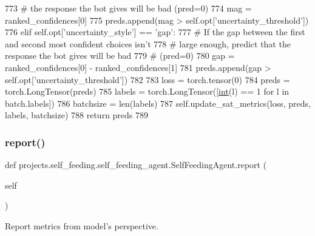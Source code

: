 \begin{DoxyCode}
773                 \textcolor{comment}{# the response the bot gives will be bad (pred=0)}
774                 mag = ranked\_confidences[0]
775                 preds.append(mag > self.opt[\textcolor{stringliteral}{'uncertainty\_threshold'}])
776             \textcolor{keywordflow}{elif} self.opt[\textcolor{stringliteral}{'uncertainty\_style'}] == \textcolor{stringliteral}{'gap'}:
777                 \textcolor{comment}{# If the gap between the first and second most confident choices isn't}
778                 \textcolor{comment}{# large enough, predict that the response the bot gives will be bad}
779                 \textcolor{comment}{# (pred=0)}
780                 gap = ranked\_confidences[0] - ranked\_confidences[1]
781                 preds.append(gap > self.opt[\textcolor{stringliteral}{'uncertainty\_threshold'}])
782 
783         loss = torch.tensor(0)
784         preds = torch.LongTensor(preds)
785         labels = torch.LongTensor([\hyperlink{namespacelanguage__model_1_1eval__ppl_a7d12ee00479673c5c8d1f6d01faa272a}{int}(l) == 1 \textcolor{keywordflow}{for} l \textcolor{keywordflow}{in} batch.labels])
786         batchsize = len(labels)
787         self.update\_sat\_metrics(loss, preds, labels, batchsize)
788         \textcolor{keywordflow}{return} preds
789 
\end{DoxyCode}
\mbox{\label{classprojects_1_1self__feeding_1_1self__feeding__agent_1_1SelfFeedingAgent_a456725f7e04d7452bd14f733fb3cea35}} 
\subsubsection{\texorpdfstring{report()}{report()}}
{\footnotesize\ttfamily def projects.\+self\+\_\+feeding.\+self\+\_\+feeding\+\_\+agent.\+Self\+Feeding\+Agent.\+report (\begin{DoxyParamCaption}\item[{}]{self }\end{DoxyParamCaption})}

\begin{DoxyVerb}Report metrics from model's perspective.
\end{DoxyVerb}
 


